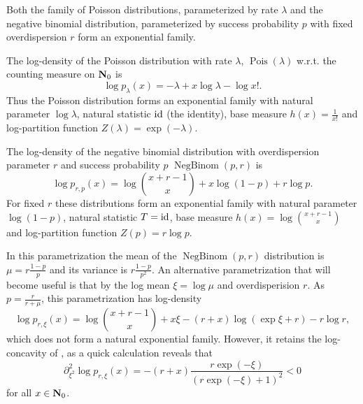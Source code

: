 \begin{example}
    \label{ex:pois_negbinom}
    Both the family of Poisson distributions, parameterized by rate $\lambda$ and the negative binomial distribution, parameterized by success probability $p$ with fixed overdispersion $r$ form an exponential family.

    The log-density of the Poisson distribution with rate $\lambda$, $\operatorname{Pois} (\lambda)$ w.r.t. the counting measure on $\mathbf N_{0}$ is 
    $$
    \log p_{\lambda} (x) = -\lambda + x\log \lambda - \log x!.
    $$
    Thus the Poisson distribution forms an exponential family with natural parameter $\log \lambda$, natural statistic $\operatorname{id}$ (the identity), base measure $h(x) = \frac{1}{x!}$ and log-partition function $Z(\lambda) = \exp \left( -\lambda \right)$. 

    The log-density of the negative binomial distribution with overdispersion parameter $r$ and success probability $p$ $\operatorname{NegBinom} \left( p, r \right)$ is 
    $$
    \log p_{r,p}(x) = \log \binom{x + r - 1}{x} + x \log (1 - p) + r \log p.
    $$
    For fixed $r$ these distributions form an exponential family with natural parameter $\log (1 - p )$, natural statistic $T = \operatorname{id}$, base measure $h(x) = \log \binom{x + r - 1}{x}$ and log-partition function $Z(p) = r \log p$. 

    In this parametrization the mean of the $\operatorname{NegBinom}(p,r)$ distribution is $\mu = r \frac{1 - p}{p}$ and its variance is $r \frac{1 - p}{p^{2}}$. An alternative parametrization that will become useful  is that by the log mean $\xi = \log \mu$ and overdisperision $r$. As $p = \frac{r}{r + \mu}$, this parametrization has log-density
    $$
    \log p_{r,\xi}(x) = \log \binom{x + r - 1}{x} + x \xi  - (r + x) \log (\exp \xi + r) - r \log r,
    $$
    which does not form a natural exponential family. However, it retains the log-concavity of , as a quick calculation reveals that 
    $$
    \partial_{\xi^{2}}^{2} \log p_{r,\xi} (x) = -(r + x) \frac{r \exp (-\xi)}{(r \exp (-\xi) + 1)^{2}} < 0
    $$
    for all $x \in \mathbf N_{0}$. 
\end{example}


